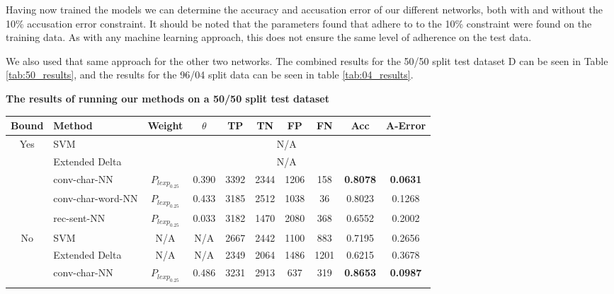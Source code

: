 Having now trained the models we can determine the accuracy and accusation error
of our different networks, both with and without the 10\% accusation error
constraint. It should be noted that the parameters found that adhere to to the
10\% constraint were found on the training data. As with any machine learning
approach, this does not ensure the same level of adherence on the test data.

We also used that same approach for the other two networks. The combined
results for the 50/50 split test dataset \gls{D} can be seen in Table
\ref{tab:50_results}, and the results for the 96/04 split data can be seen in
table \ref{tab:04_results}.

\begin{table}[]
\centering
\textbf{The results of running our methods on a 50/50 split test dataset}\par\medskip
\begin{tabular}{|c|l|c|c|c|c|c|c|c|c|}
\hline
Bound                & Method                  & Weight            & $\theta$ & TP  & TN  & FP  & FN  & Acc             & A-Error         \\ \hline
\multirow{5}{*}{Yes} & SVM                     & \multicolumn{8}{c|}{N/A}                                                                     \\ \cline{2-10} 
                     & Extended Delta          & \multicolumn{8}{c|}{N/A}                                                                     \\ \cline{2-10} 
                     & \gls{conv-char-NN}      & $P_{lexp_{0.25}}$ & 0.390    & 3392 & 2344 & 1206 & 158  & \textbf{0.8078} & \textbf{0.0631} \\ \cline{2-10} 
                     & \gls{conv-char-word-NN} & $P_{lexp_{0.25}}$ & 0.433    & 3185 & 2512 & 1038 & 36   & 0.8023          & 0.1268          \\ \cline{2-10} 
                     & \gls{rec-sent-NN}       & $P_{lexp_{0.25}}$ & 0.033    & 3182 & 1470 & 2080 & 368  & 0.6552          & 0.2002          \\ \hline\hline
\multirow{5}{*}{No}  & SVM                     & N/A               & N/A      & 2667 & 2442 & 1100 & 883  & 0.7195          & 0.2656          \\ \cline{2-10} 
                     & Extended Delta          & N/A               & N/A      & 2349 & 2064 & 1486 & 1201 & 0.6215          & 0.3678          \\ \cline{2-10} 
                     & \gls{conv-char-NN}      & $P_{lexp_{0.25}}$ & 0.486    & 3231 & 2913 & 637  & 319  & \textbf{0.8653} & \textbf{0.0987} \\ \cline{2-10} 

\end{tabular}
\end{table}
